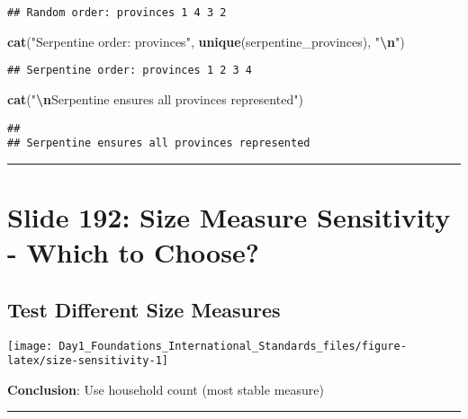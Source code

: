 \documentclass[
]{article}
\newenvironment{Shaded}{\begin{snugshade}}{\end{snugshade}}
\newcommand{\FunctionTok}[1]{\textcolor[rgb]{0.13,0.29,0.53}{\textbf{#1}}}
\newcommand{\NormalTok}[1]{#1}
\newcommand{\SpecialCharTok}[1]{\textcolor[rgb]{0.81,0.36,0.00}{\textbf{#1}}}
\newcommand{\StringTok}[1]{\textcolor[rgb]{0.31,0.60,0.02}{#1}}
\begin{document}
\begin{verbatim}
## Random order: provinces 1 4 3 2
\end{verbatim}

\begin{Shaded}
\begin{Highlighting}[]
\FunctionTok{cat}\NormalTok{(}\StringTok{"Serpentine order: provinces"}\NormalTok{, }\FunctionTok{unique}\NormalTok{(serpentine\_provinces), }\StringTok{"}\SpecialCharTok{\textbackslash{}n}\StringTok{"}\NormalTok{)}
\end{Highlighting}
\end{Shaded}

\begin{verbatim}
## Serpentine order: provinces 1 2 3 4
\end{verbatim}

\begin{Shaded}
\begin{Highlighting}[]
\FunctionTok{cat}\NormalTok{(}\StringTok{"}\SpecialCharTok{\textbackslash{}n}\StringTok{Serpentine ensures all provinces represented"}\NormalTok{)}
\end{Highlighting}
\end{Shaded}

\begin{verbatim}
## 
## Serpentine ensures all provinces represented
\end{verbatim}

\begin{center}\rule{0.5\linewidth}{0.5pt}\end{center}

\section{Slide 192: Size Measure Sensitivity - Which to
Choose?}\label{slide-192-size-measure-sensitivity---which-to-choose}

\subsection{Test Different Size
Measures}\label{test-different-size-measures}

\texttt{[image: Day1\_Foundations\_International\_Standards\_files/figure-latex/size-sensitivity-1]}

\textbf{Conclusion}: Use household count (most stable measure)

\begin{center}\rule{0.5\linewidth}{0.5pt}\end{center}
\end{document}
